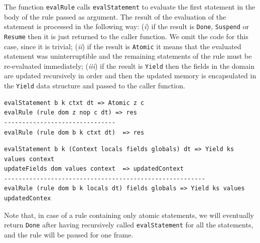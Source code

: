 The function \texttt{evalRule} calls \texttt{evalStatement} to evaluate the first statement in the body of the rule passed as argument. The result of the evaluation of the statement is processed in the following way: (\textit{i}) if the result is \texttt{Done}, \texttt{Suspend} or \texttt{Resume} then it is just returned to the caller function. We omit the code for this case, since it is trivial; (\textit{ii}) if the result is \texttt{Atomic} it means that the evaluated statement was uninterruptible and the remaining statements of the rule must be re-evaluated immediately; (\textit{iii}) if the result is \texttt{Yield} then the fields in the domain are updated recursively in order and then the updated memory is encapsulated in the \texttt{Yield} data structure and passed to the caller function.

\vspace{0.1cm}
\begin{lstlisting}
evalStatement b k ctxt dt => Atomic z c    
evalRule (rule dom z nop c dt) => res
-------------------------------
evalRule (rule dom b k ctxt dt)  => res
\end{lstlisting}

\begin{lstlisting}
evalStatement b k (Context locals fields globals) dt => Yield ks values context
updateFields dom values context  => updatedContext
--------------------------------------------------------
evalRule (rule dom b k locals dt) fields globals => Yield ks values updatedContex
\end{lstlisting}

Note that, in case of a rule containing only atomic statements, we will eventually return \texttt{Done} after having recursively called \texttt{evalStatement} for all the statements, and the rule will be paused for one frame.

